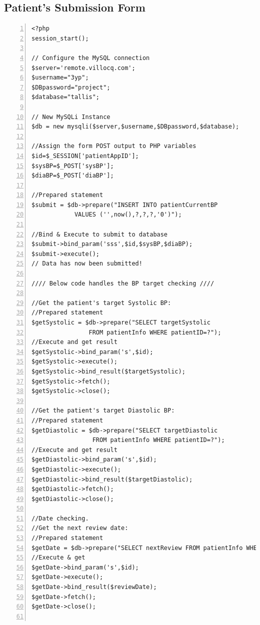\documentclass[11pt]{article}
\begin{document}
\subsection{Patient's Submission Form}


\begin{lstlisting}[numbers=left,frame=lines,label=patient-submit-form,showstringspaces=false]
<?php
session_start();

// Configure the MySQL connection
$server='remote.villocq.com';
$username="3yp";
$DBpassword="project";
$database="tallis";

// New MySQLi Instance
$db = new mysqli($server,$username,$DBpassword,$database);

//Assign the form POST output to PHP variables
$id=$_SESSION['patientAppID'];
$sysBP=$_POST['sysBP'];
$diaBP=$_POST['diaBP'];

//Prepared statement
$submit = $db->prepare("INSERT INTO patientCurrentBP 
			VALUES ('',now(),?,?,?,'0')");

//Bind & Execute to submit to database
$submit->bind_param('sss',$id,$sysBP,$diaBP);
$submit->execute();
// Data has now been submitted!

//// Below code handles the BP target checking ////

//Get the patient's target Systolic BP:
//Prepared statement
$getSystolic = $db->prepare("SELECT targetSystolic 
			    FROM patientInfo WHERE patientID=?");
//Execute and get result
$getSystolic->bind_param('s',$id);
$getSystolic->execute();
$getSystolic->bind_result($targetSystolic);
$getSystolic->fetch();
$getSystolic->close();

//Get the patient's target Diastolic BP:
//Prepared statement
$getDiastolic = $db->prepare("SELECT targetDiastolic 
			     FROM patientInfo WHERE patientID=?");
//Execute and get result
$getDiastolic->bind_param('s',$id);
$getDiastolic->execute();
$getDiastolic->bind_result($targetDiastolic);
$getDiastolic->fetch();
$getDiastolic->close();

//Date checking.
//Get the next review date:
//Prepared statement
$getDate = $db->prepare("SELECT nextReview FROM patientInfo WHERE patientID=?");
//Execute & get
$getDate->bind_param('s',$id);
$getDate->execute();
$getDate->bind_result($reviewDate);
$getDate->fetch();
$getDate->close();


\end{lstlisting}
\end{document}
